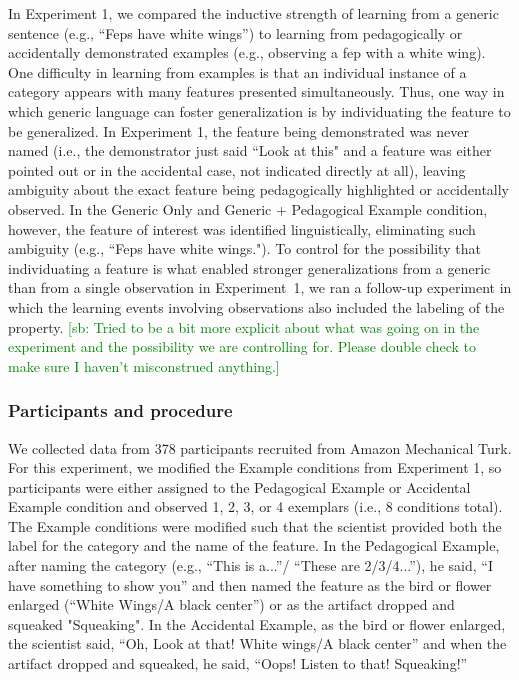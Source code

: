 \documentclass[10pt,letterpaper]{article}
\newcommand{\soph}[1]{\textcolor{Green}{[sb: #1]}}
\begin{document}
In Experiment 1, we compared the inductive strength of learning from a generic sentence (e.g., ``Feps have white wings'') to learning from pedagogically or accidentally demonstrated examples (e.g., observing a fep with a white wing). 
One difficulty in learning from examples is that an individual instance of a category appears with many features presented simultaneously. 
Thus, one way in which generic language can foster generalization is by individuating the feature to be generalized. In Experiment 1, the feature being demonstrated was never named (i.e., the demonstrator just said ``Look at this" and a feature was either pointed out or in the accidental case, not indicated directly at all), leaving ambiguity about the exact feature being pedagogically highlighted or accidentally observed. In the Generic Only and Generic + Pedagogical Example condition, however, the feature of interest was identified linguistically, eliminating such ambiguity (e.g., ``Feps have white wings.").
To control for the possibility that individuating a feature is what enabled stronger generalizations from a generic than from a single observation in Experiment~1, we ran a follow-up experiment in which the learning events involving observations also included the labeling of the property. \soph{Tried to be a bit more explicit about what was going on in the experiment and the possibility we are controlling for. Please double check to make sure I haven't misconstrued anything.}

\subsubsection{Participants and procedure}

We collected data from 378 participants recruited from Amazon Mechanical Turk.
For this experiment, we modified the Example conditions from Experiment 1, so participants were either assigned to the Pedagogical Example or Accidental Example condition and observed 1, 2, 3, or 4 exemplars (i.e., 8 conditions total). The Example conditions were modified such that the scientist provided both the label for the category and the name of the feature. In the Pedagogical Example, after naming the category (e.g., ``This is a...''/ ``These are 2/3/4...''), he said, ``I have something to show you'' and then named the feature as the bird or flower enlarged (``White Wings/A black center'') or as the artifact dropped and squeaked "Squeaking".
In the Accidental Example, as the bird or flower enlarged, the scientist said, ``Oh, Look at that! White wings/A black center'' and when the artifact dropped and squeaked, he said, ``Oops! Listen to that! Squeaking!'' 
\end{document}
